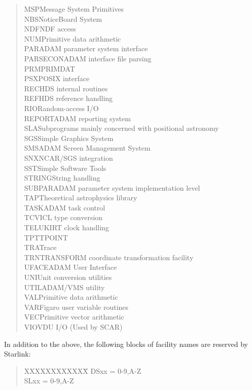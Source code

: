\documentclass[twoside,11pt]{article}
\renewcommand{\_}{{\tt\char'137}}
\begin{document}
\begin{quote}
\begin{tabbing}
MSP\>Message System Primitives\\
NBS\>NoticeBoard System\\
NDF\>NDF access\\
NUM\>Primitive data arithmetic\\
PAR\>ADAM parameter system interface\\
PARSECON\>ADAM interface file parsing\\
PRM\>PRIMDAT\\
PSX\>POSIX interface\\
REC\>HDS internal routines\\
REF\>HDS reference handling\\
RIO\>Random-access I/O\\
REPORT\>ADAM reporting system\\
SLA\>Subprograms mainly concerned with positional astronomy\\
SGS\>Simple Graphics System\\
SMS\>ADAM Screen Management System\\
SNX\>NCAR/SGS integration\\
SST\>Simple Software Tools\\
STRING\>String handling\\
SUBPAR\>ADAM parameter system implementation level\\
TAP\>Theoretical astrophysics library\\
TASK\>ADAM task control\\
TCV\>ICL type conversion\\
TEL\>UKIRT clock handling\\
TPT\>TPOINT\\
TRA\>Trace\\
TRN\>TRANSFORM coordinate transformation facility\\
UFACE\>ADAM User Interface\\
UNI\>Unit conversion utilities\\
UTIL\>ADAM/VMS utility\\
VAL\>Primitive data arithmetic\\
VAR\>Figaro user variable routines\\
VEC\>Primitive vector arithmetic\\
VIO\>VDU I/O (Used by SCAR)
\end{tabbing}
\end{quote}
\goodbreak
In addition to the above, the following blocks of facility names
are reserved by Starlink:
\begin{quote}
\begin{tabbing}
XXXXXXXXXXXX\=\kill
DSx\>x = 0-9,A-Z\\
SLx\>x = 0-9,A-Z
\end{tabbing}
\end{quote}
\end{document}
